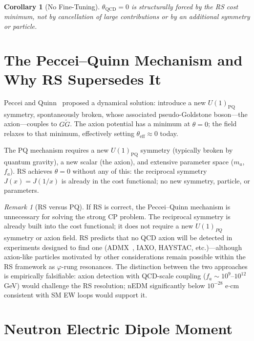 \documentclass[12pt,a4paper]{article}
\newtheorem{corollary}[theorem]{Corollary}
\theoremstyle{definition}
\theoremstyle{remark}
\newtheorem{remark}[theorem]{Remark}
\begin{document}
\begin{corollary}[No Fine-Tuning]
\label{cor:no-fine-tuning}
$\theta_{\mathrm{QCD}} = 0$ is structurally forced by the RS cost
minimum, not by cancellation of large contributions or by an additional
symmetry or particle.
\end{corollary}

\section{The Peccei--Quinn Mechanism and Why RS Supersedes It}
\label{sec:pq}

Peccei and Quinn~\cite{Peccei1977} proposed a dynamical solution: introduce
a new $U(1)_{\mathrm{PQ}}$ symmetry, spontaneously broken, whose
associated pseudo-Goldstone boson---the axion---couples to
$G\tilde{G}$.  The axion potential has a minimum at $\theta = 0$;
the field relaxes to that minimum, effectively setting
$\theta_{\mathrm{eff}} \approx 0$ today.

The PQ mechanism requires a new $U(1)_{\mathrm{PQ}}$ symmetry
(typically broken by quantum gravity), a new scalar (the axion), and
extensive parameter space ($m_a$, $f_a$).  RS achieves $\theta = 0$
without any of this: the reciprocal symmetry $J(x) = J(1/x)$ is
already in the cost functional; no new symmetry, particle, or
parameters.

\begin{remark}[RS versus PQ]
If RS is correct, the Peccei--Quinn mechanism is unnecessary for
solving the strong CP problem.  The reciprocal symmetry is already
built into the cost functional; it does not require a new $U(1)_{PQ}$
symmetry or axion field.  RS predicts that no QCD axion will be
detected in experiments designed to find one
(ADMX~\cite{ADMX2022}, IAXO, HAYSTAC, etc.)---although axion-like
particles motivated by other considerations remain possible within
the RS framework as $\varphi$-rung resonances.  The distinction
between the two approaches is empirically falsifiable: axion detection
with QCD-scale coupling ($f_a \sim 10^9$--$10^{12}$ GeV) would
challenge the RS resolution; nEDM significantly below $10^{-28}$
e$\cdot$cm consistent with SM EW loops would support it.
\end{remark}

\section{Neutron Electric Dipole Moment}
\label{sec:nedm}
\end{document}

